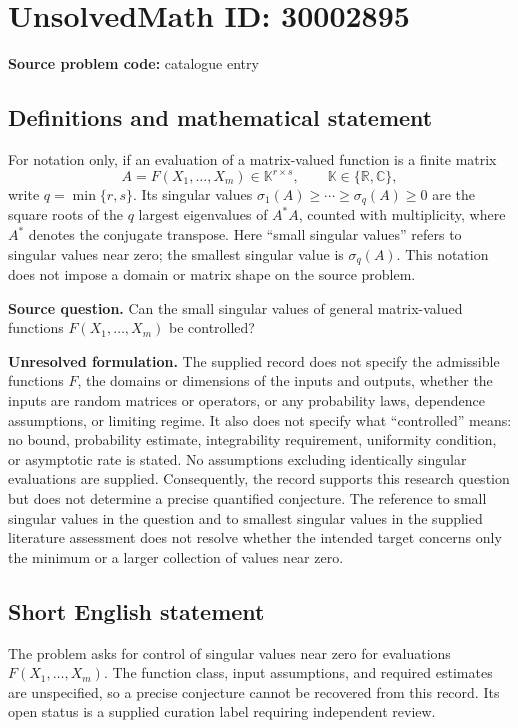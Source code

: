 \documentclass[11pt]{article}
\newcommand{\R}{\mathbb{R}}
\newcommand{\C}{\mathbb{C}}
\begin{document}
\section*{UnsolvedMath ID: 30002895}
\textbf{Source problem code:} catalogue entry
\subsection{Definitions and mathematical statement}
For notation only, if an evaluation of a matrix-valued function is a finite matrix
\[
A=F(X_1,\ldots,X_m)\in\mathbb K^{r\times s},\qquad \mathbb K\in\{\R,\C\},
\]
write \(q=\min\{r,s\}\). Its singular values \(\sigma_1(A)\ge\cdots\ge\sigma_q(A)\ge0\) are the square roots of the \(q\) largest eigenvalues of \(A^*A\), counted with multiplicity, where \(A^*\) denotes the conjugate transpose. Here ``small singular values'' refers to singular values near zero; the smallest singular value is \(\sigma_q(A)\). This notation does not impose a domain or matrix shape on the source problem.

\textbf{Source question.} Can the small singular values of general matrix-valued functions \(F(X_1,\ldots,X_m)\) be controlled?

\textbf{Unresolved formulation.} The supplied record does not specify the admissible functions \(F\), the domains or dimensions of the inputs and outputs, whether the inputs are random matrices or operators, or any probability laws, dependence assumptions, or limiting regime. It also does not specify what ``controlled'' means: no bound, probability estimate, integrability requirement, uniformity condition, or asymptotic rate is stated. No assumptions excluding identically singular evaluations are supplied. Consequently, the record supports this research question but does not determine a precise quantified conjecture. The reference to small singular values in the question and to smallest singular values in the supplied literature assessment does not resolve whether the intended target concerns only the minimum or a larger collection of values near zero.
\subsection{Short English statement}
The problem asks for control of singular values near zero for evaluations \(F(X_1,\ldots,X_m)\). The function class, input assumptions, and required estimates are unspecified, so a precise conjecture cannot be recovered from this record. Its open status is a supplied curation label requiring independent review.
\end{document}
